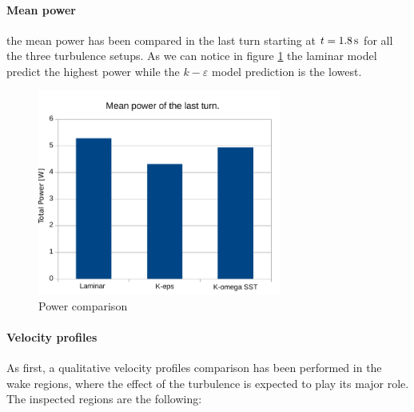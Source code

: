 \documentclass[a4paper,12pt]{article}
\newcommand{\kepsilon}{$k\!-\!\varepsilon $ }
\begin{document}
\paragraph{Mean power}
the mean power has been compared in the last turn starting at $t=1.8\,\text{s}$ for all the three turbulence setups. 
As we can notice in figure \ref{fig:turbolence-powercomparison} the laminar model predict the highest power while the \kepsilon model prediction is the lowest.

\begin{figure}[H]
\centering
\includegraphics[width=8cm]{images/turbulence/MeanPower_comparison.pdf} 
\caption{Power comparison}
\label{fig:turbolence-powercomparison}
\centering
\end{figure}



\paragraph{Velocity profiles}
As first, a qualitative velocity profiles comparison has been performed in the wake regions,
where the effect of the turbulence is expected to play its major role.
The inspected regions are the following:
\begin{figure}[H]
\centering
{}
\end{figure}
\end{document}

